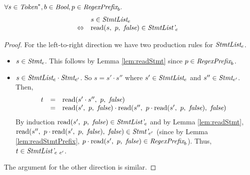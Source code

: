 \documentclass[preprint,10pt]{sigplanconf}
\begin{document}
\begin{lemma}\mbox{}

  \( \forall s \in \textit{Token}^*, b \in \textit{Bool}, p \in \textit{RegexPrefix}_b. \)
  \[
  \begin{array}{rl}
  &s \in \textit{StmtList}_{e} 
  \\
  \Leftrightarrow &
  \textrm{read}(s,~p,~\textit{false}) \in \textit{StmtList'}_{e}
  \end{array}
  \]
\end{lemma}
\begin{proof}
  For the left-to-right direction we have two production rules for
  \( \textit{StmtList}_{e} \).
  \begin{itemize}
  \item \( s \in \textit{Stmt}_{e} \).
    This follows by Lemma \ref{lem:readStmt} since \( p \in \textit{RegexPrefix}_b \).

  \item \( s \in \textit{StmtList}_{e} \cdot \textit{Stmt}_{e'} \). So \( s =
    s' \cdot s'' \) where \( s' \in \textit{StmtList}_{e} \) and \( s''
    \in \textit{Stmt}_{e'} \). Then,
    \[
    \begin{array}{rcl}
      t &=& \textrm{read}(s' \cdot s'',~p,~\textit{false})
      \\
      &=& \textrm{read}(s',~p,~\textit{false}) \cdot \textrm{read}(s'',~p 
        \cdot \textrm{read}(s',~p,~\textit{false}),~\textit{false})
    \end{array}
    \]
    By induction \( \textrm{read}(s',~p,~\textit{false}) \in \textit{StmtList'}_{e} \)
    and by Lemma \ref{lem:readStmt}, \( \textrm{read}(s'',~p \cdot
      \textrm{read}(s',~p,~\textit{false}),~\textit{false}) \in \textit{Stmt'}_{e'} \) (since
    by Lemma \ref{lem:readStmtPrefix}, \( p \cdot
    \textrm{read}(s',~p,~\textit{false}) \in \textit{RegexPrefix}_b \)). Thus, \( t \in
    \textit{StmtList'}_{e~e'} \).
  \end{itemize}
  
  The argument for the other direction is similar.
\end{proof}
\end{document}
